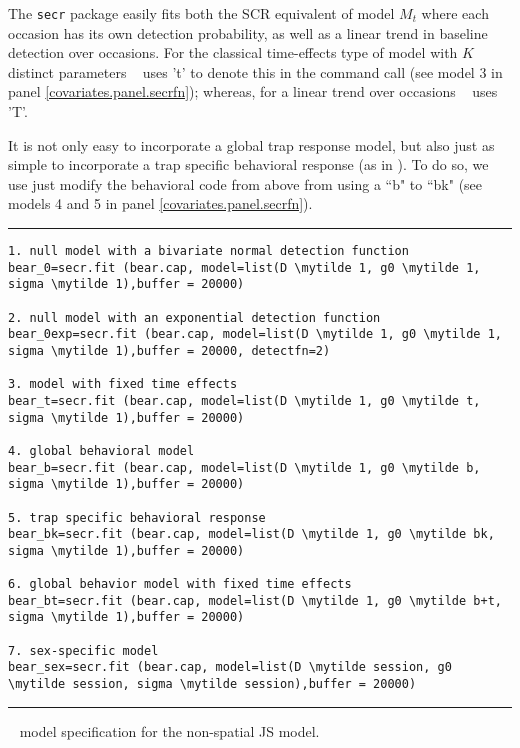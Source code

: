 The \mbox{\tt secr} package easily fits both the SCR equivalent of model
$M_{t}$ where each
occasion has its own detection probability, as well as a linear
trend in baseline detection over occasions. For the classical
time-effects type of model with $K$ distinct parameters \secr~ uses 't' to denote
this in the command call (see model 3 in 
panel \ref{covariates.panel.secrfn}); whereas, for a linear
trend over occasions \secr~ uses 'T'.

It is not only easy to incorporate a global trap response model, 
but also just as simple to
incorporate a trap specific behavioral response (as in
\citet{royle_etal:2009}).  To do so, we use just modify
the behavioral code from above from using a ``b" to ``bk" 
(see models 4 and 5 in 
panel \ref{covariates.panel.secrfn}).

\begin{panel}[htp]
\centering
\rule[0.1in]{\textwidth}{.03in}
{\small
\begin{Verbatim}[commandchars=\\\{\}]
1. null model with a bivariate normal detection function
bear_0=secr.fit (bear.cap, model=list(D \mytilde 1, g0 \mytilde 1, sigma \mytilde 1),buffer = 20000)

2. null model with an exponential detection function
bear_0exp=secr.fit (bear.cap, model=list(D \mytilde 1, g0 \mytilde 1, sigma \mytilde 1),buffer = 20000, detectfn=2)

3. model with fixed time effects
bear_t=secr.fit (bear.cap, model=list(D \mytilde 1, g0 \mytilde t, sigma \mytilde 1),buffer = 20000)

4. global behavioral model
bear_b=secr.fit (bear.cap, model=list(D \mytilde 1, g0 \mytilde b, sigma \mytilde 1),buffer = 20000)

5. trap specific behavioral response
bear_bk=secr.fit (bear.cap, model=list(D \mytilde 1, g0 \mytilde bk, sigma \mytilde 1),buffer = 20000)

6. global behavior model with fixed time effects
bear_bt=secr.fit (bear.cap, model=list(D \mytilde 1, g0 \mytilde b+t, sigma \mytilde 1),buffer = 20000)

7. sex-specific model
bear_sex=secr.fit (bear.cap, model=list(D \mytilde session, g0 \mytilde session, sigma \mytilde session),buffer = 20000)

\end{Verbatim}
}

\rule[-0.1in]{\textwidth}{.03in}
\caption{
\jags~ model specification for the non-spatial JS model.}
\label{covariates.panel.secrfn}
\end{panel}




